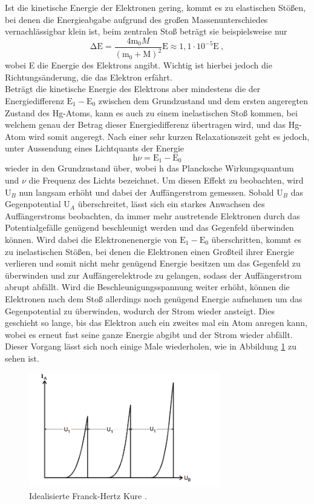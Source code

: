 Ist die kinetische Energie der Elektronen gering, kommt es zu elastischen Stößen, bei
denen die Energieabgabe aufgrund des großen Massenunterschiedes vernachlässigbar klein ist,
beim zentralen Stoß beträgt sie beispielsweise nur
\begin{equation*}
  \increment \text{E} = \frac{4\text{m}_0 M}{(\text{m}_0 + \text{M})^2}\text{E} \approx 1,1 \cdot 10^{-5} \text{E} \:,
\end{equation*}
wobei E die Energie des Elektrons angibt.
Wichtig ist hierbei jedoch die Richtungsänderung, die das Elektron erfährt.\\
Beträgt die kinetische Energie des Elektrons aber mindestens die der Energiedifferenz $ \text{E}_1 - \text{E}_0$
zwischen dem Grundzustand und dem ersten angeregten Zustand des Hg-Atoms, kann es auch zu einem
inelastischen Stoß kommen, bei welchem genau der Betrag dieser Energiedifferenz übertragen wird,
und das Hg-Atom wird somit angeregt. Nach einer sehr kurzen Relaxationszeit geht es jedoch, unter
Aussendung eines Lichtquants der Energie
\begin{equation}
  \text{h}\nu = \text{E}_1 - \text{E}_0
  \label{eqn:quant}
\end{equation}
wieder in den Grundzustand über, wobei h das Plancksche Wirkungsquantum und $\nu$ die Frequenz des
Lichts bezeichnet.
Um diesen Effekt zu beobachten, wird $\text{U}_B$ nun langsam erhöht und dabei der Auffängerstrom gemessen.
Sobald $\text{U}_B$ das Gegenpotential $\text{U}_A$ überschreitet, lässt sich ein
starkes Anwachsen des Auffängerstroms beobachten, da immer mehr austretende Elektronen
durch das Potentialgefälle genügend beschleunigt werden und das Gegenfeld überwinden können. Wird dabei die Elektronenenergie
von $\text{E}_1 - \text{E}_0$ überschritten, kommt es zu inelastischen Stößen, bei denen
die Elektronen einen Großteil ihrer Energie verlieren und somit nicht mehr genügend
Energie besitzen um das Gegenfeld zu überwinden und zur Auffängerelektrode zu gelangen, sodass
der Auffängerstrom abrupt abfällt.
Wird die Beschleunigungsspannung weiter erhöht, können die Elektronen nach dem Stoß allerdings
noch genügend Energie aufnehmen um das Gegenpotential zu überwinden, wodurch der Strom wieder ansteigt.
Dies geschieht so lange, bis das Elektron auch ein zweites mal ein Atom anregen kann, wobei
es erneut fast seine ganze Energie abgibt und der Strom wieder abfällt. Dieser Vorgang lässt sich
noch einige Male wiederholen, wie in Abbildung \ref{fig:kurve} zu sehen ist.
\begin{figure}[H]
  \centering
  \includegraphics[height=5cm]{Kurve.png}
  \caption{Idealisierte Franck-Hertz Kure \cite{skript}.}
  \label{fig:kurve}
\end{figure}
